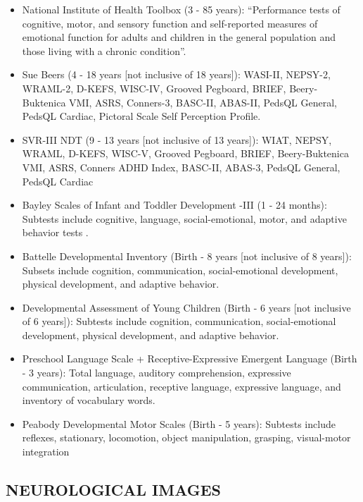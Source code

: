 \begin{itemize}
\item National Institute of Health Toolbox (3 - 85 years): ``Performance tests of cognitive, motor, and sensory function and self-reported measures of emotional function for adults and children in the general population and those living with a chronic condition''.

\item Sue Beers (4 - 18 years [not inclusive of 18 years]): WASI-II, NEPSY-2, WRAML-2, D-KEFS, WISC-IV, Grooved Pegboard, BRIEF, Beery-Buktenica VMI, ASRS, Conners-3, BASC-II, ABAS-II, PedsQL General, PedsQL Cardiac, Pictoral Scale Self Perception Profile.

\item SVR-III NDT (9 - 13 years [not inclusive of 13 years]): WIAT, NEPSY, WRAML, D-KEFS, WISC-V, Grooved Pegboard, BRIEF, Beery-Buktenica VMI, ASRS, Conners ADHD Index, BASC-II, ABAS-3, PedsQL General, PedsQL Cardiac

\item Bayley Scales of Infant and Toddler Development -III (1 - 24 months): Subtests include cognitive, language, social-emotional, motor, and adaptive behavior tests \cite{Mebius2017}.

\item Battelle Developmental Inventory (Birth - 8 years [not inclusive of 8 years]): Subsets include cognition, communication, social-emotional development, physical development, and adaptive behavior.

\item Developmental Assessment of Young Children (Birth - 6 years [not inclusive of 6 years]): Subtests include cognition, communication, social-emotional development, physical development, and adaptive behavior.

\item Preschool Language Scale + Receptive-Expressive Emergent Language (Birth - 3 years): Total language, auditory comprehension, expressive communication, articulation, receptive language, expressive language, and inventory of vocabulary words.

\item Peabody Developmental Motor Scales (Birth - 5 years): Subtests include reflexes, stationary, locomotion, object manipulation, grasping, visual-motor integration
\end{itemize}

\subsection{NEUROLOGICAL IMAGES}

